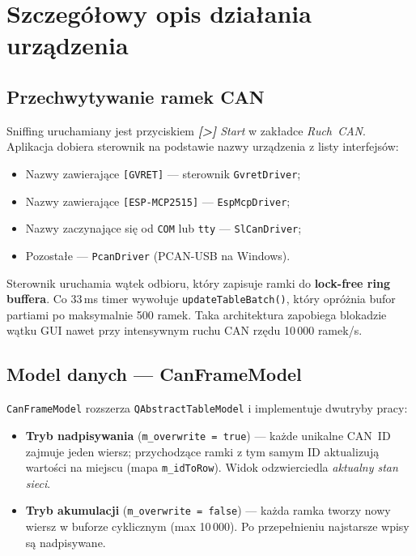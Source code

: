 \documentclass[12pt, a4paper]{article}
\begin{document}
\section{Szczegółowy opis działania urządzenia}

\subsection{Przechwytywanie ramek CAN}

Sniffing uruchamiany jest przyciskiem \emph{\textbf{[>]} Start} w zakładce \emph{Ruch~CAN}.
Aplikacja dobiera sterownik na podstawie nazwy urządzenia z listy interfejsów:
\begin{itemize}
  \item Nazwy zawierające \texttt{[GVRET]} --- sterownik \texttt{GvretDriver};
  \item Nazwy zawierające \texttt{[ESP-MCP2515]} --- \texttt{EspMcpDriver};
  \item Nazwy zaczynające się od \texttt{COM} lub \texttt{tty} --- \texttt{SlCanDriver};
  \item Pozostałe --- \texttt{PcanDriver} (PCAN-USB na Windows).
\end{itemize}

Sterownik uruchamia wątek odbioru, który zapisuje ramki do
\textbf{lock-free ring buffera}. Co 33\,ms timer wywołuje
\texttt{updateTableBatch()}, który opróżnia bufor partiami po
maksymalnie 500 ramek. Taka architektura zapobiega blokadzie
wątku GUI nawet przy intensywnym ruchu CAN rzędu 10\,000 ramek/s.

\subsection{Model danych --- CanFrameModel}

\texttt{CanFrameModel} rozszerza \texttt{QAbstractTableModel}
i implementuje dwutryby pracy:

\begin{itemize}
  \item \textbf{Tryb nadpisywania} (\texttt{m\_overwrite = true}) ---
        każde unikalne CAN~ID zajmuje jeden wiersz; przychodzące ramki
        z tym samym ID aktualizują wartości na miejscu (mapa
        \texttt{m\_idToRow}). Widok odzwierciedla \emph{aktualny stan sieci}.
  \item \textbf{Tryb akumulacji} (\texttt{m\_overwrite = false}) ---
        każda ramka tworzy nowy wiersz w buforze cyklicznym (max 10\,000).
        Po przepełnieniu najstarsze wpisy są nadpisywane.
\end{itemize}
\end{document}
